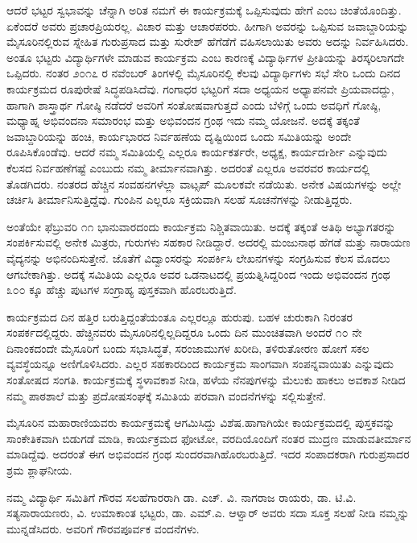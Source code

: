{ಆದರೆ ಭಟ್ಟರ ಸ್ವಭಾವನ್ನು ಚೆನ್ನಾಗಿ ಅರಿತ ನಮಗೆ ಈ ಕಾರ್ಯಕ್ರಮಕ್ಕೆ ಒಪ್ಪಿಸುವುದು ಹೇಗೆ ಎಂಬ ಚಿಂತೆಯೊಂದಿತ್ತು. ಏಕೆಂದರೆ ಅವರು ಪ್ರಚಾರಪ್ರಿಯರಲ್ಲ. ವಿಚಾರ ಮತ್ತು ಆಚಾರಪರರು. ಹೀಗಾಗಿ ಅವರನ್ನು ಒಪ್ಪಿಸುವ ಜವಾಬ್ದಾರಿಯನ್ನು ಮೈಸೂರಿನಲ್ಲಿರುವ ಸ್ನೇಹಿತ ಗುರುಪ್ರಸಾದ ಮತ್ತು ಸುರೇಶ್ ಹೆಗೆಡೆಗೆ ವಹಿಸಲಾಯಿತು ಅವರು ಅದನ್ನು ನಿರ್ವಹಿಸಿದರು. ಅಂತೂ ಭಟ್ಟರು ವಿದ್ಯಾರ್ಥಿಗಳೇ ಮಾಡುವ ಕಾರ್ಯಕ್ರಮ ಎಂಬ ಕಾರಣಕ್ಕೆ ವಿದ್ಯಾರ್ಥಿಗಳ ಪ್ರೀತಿಯನ್ನು ತಿರಸ್ಕರಿಲಾಗದೇ ಒಪ್ಪಿದರು. ನಂತರ ೨೦೧೭ ರ ನವೆಂಬರ್ ತಿಂಗಳಲ್ಲಿ ಮೈಸೂರಿನಲ್ಲಿ ಕೆಲವು ವಿದ್ಯಾರ್ಥಿಗಳು ಸಭೆ ಸೇರಿ ಒಂದು ದಿನದ ಕಾರ್ಯಕ್ರಮದ ರೂಪುರೇಷೆ ಸಿದ್ಧಪಡಿಸಿದೆವು. ಗಂಗಾಧರ ಭಟ್ಟರಿಗೆ ಸದಾ ಅಧ್ಯಯನ ಅಧ್ಯಾಪನವೇ ಪ್ರಿಯವಾದದ್ದು, ಹಾಗಾಗಿ ಶಾಸ್ತ್ರಾರ್ಥ ಗೋಷ್ಠಿ ನಡೆದರೆ ಅವರಿಗೆ ಸಂತೋಷವಾಗುತ್ತದೆ ಎಂದು ಬೆಳಿಗ್ಗೆ ಒಂದು ಅವಧಿಗೆ ಗೋಷ್ಠಿ, ಮಧ್ಯಾಹ್ನ ಅಭಿವಂದನಾ ಸಮಾರಂಭ ಮತ್ತು ಅಭಿವಂದನ ಗ್ರಂಥ ಇದು ನಮ್ಮ ಯೋಜನೆ. ಅದಕ್ಕೆ ತಕ್ಕಂತೆ ಜವಾಬ್ದಾರಿಯನ್ನು ಹಂಚಿ, ಕಾರ್ಯಭಾರದ ನಿರ್ವಹಣೆಯ ದೃಷ್ಟಿಯಿಂದ ಒಂದು ಸಮಿತಿಯನ್ನು ಅಂದೇ ರೂಪಿಸಿಕೊಂಡೆವು. ಆದರೆ ನಮ್ಮ ಸಮಿತಿಯಲ್ಲಿ ಎಲ್ಲರೂ ಕಾರ್ಯಕರ್ತರೇ, ಅಧ್ಯಕ್ಷ, ಕಾರ್ಯದrರ್ಶೀ ಎನ್ನುವುದು ಕೆಲಸದ ನಿರ್ವಹಣೆಗಷ್ಟೆ ಎಂಬುದು ನಮ್ಮ ತೀರ್ಮಾನವಾಗಿತ್ತು. ಅದರಂತೆ ಎಲ್ಲರೂ ಅವರವರ ಕಾರ್ಯದಲ್ಲಿ ತೊಡಗಿದರು. ನಂತರದ ಹೆಚ್ಚಿನ ಸಂವಹನಗಳೆಲ್ಲಾ ವಾಟ್ಸಪ್ ಮೂಲಕವೇ ನಡೆಯಿತು. ಅನೇಕ ವಿಷಯಗಳನ್ನು ಅಲ್ಲೇ ಚರ್ಚಿಸಿ ತೀರ್ಮಾನಿಸುತ್ತಿದ್ದೆವು. ಗುಂಪಿನ ಎಲ್ಲರೂ ಸಕ್ರಿಯ\-ವಾಗಿ ಸಲಹೆ ಸೂಚನೆಗಳನ್ನು ನೀಡುತ್ತಿದ್ದರು.

ಅಂತೆಯೇ ಫೆಬ್ರುವರಿ ೧೧ ಭಾನುವಾರದಂದು ಕಾರ್ಯಕ್ರಮ ನಿಶ್ಚಿತವಾಯಿತು. ಅದಕ್ಕೆ ತಕ್ಕಂತೆ ಅತಿಥಿ ಅಭ್ಯಾಗತರನ್ನು ಸಂಪರ್ಕಿಸುವಲ್ಲಿ ಅನೇಕ ಮಿತ್ರರು, ಗುರುಗಳು ಸಹಕಾರ ನೀಡಿದ್ದಾರೆ. ಅದರಲ್ಲಿ ಮಂಜುನಾಥ ಹೆಗಡೆ ಮತ್ತು ನಾರಾಯಣ ವೈದ್ಯನನ್ನು ಅಭಿನಂದಿಸುತ್ತೇನೆ. ಜೊತೆಗೆ ವಿದ್ವಾಂಸರನ್ನು ಸಂಪರ್ಕಿಸಿ ಲೇಖನಗಳನ್ನು ಸಂಗ್ರಹಿಸುವ ಕೆಲಸ ಮೊದಲು ಆಗಬೇಕಾಗಿತ್ತು. ಅದಕ್ಕೆ ಸಮಿತಿಯ ಎಲ್ಲರೂ ಅವರ ಒಡನಾಟದಲ್ಲಿ ಪ್ರಯತ್ನಿಸಿದ್ದರಿಂದ ಇಂದು ಅಭಿವಂದನ ಗ್ರಂಥ ೩೦೦ ಕ್ಕೂ ಹೆಚ್ಚು ಪುಟಗಳ ಸಂಗ್ರಾಹ್ಯ ಪುಸ್ತಕವಾಗಿ ಹೊರಬರುತ್ತಿದೆ.

ಕಾರ್ಯಕ್ರಮದ ದಿನ ಹತ್ತಿರ ಬರುತ್ತಿದ್ದಂತೆಯಂತೂ ಎಲ್ಲರಲ್ಲೂ ಹುರುಪು. ಬಹಳ ಚುರುಕಾಗಿ ನಿರಂತರ ಸಂಪರ್ಕದಲ್ಲಿದ್ದರು. ಹೆಚ್ಚಿನವರು ಮೈಸೂರಿನಲ್ಲಿಲ್ಲದಿದ್ದರೂ ಒಂದು ದಿನ ಮುಂಚಿತವಾಗಿ ಅಂದರೆ ೧೦ ನೇ ದಿನಾಂಕದಂದೇ ಮೈಸೂರಿಗೆ ಬಂದು ಸಭಾಸಿದ್ಧತೆ, ಸರಂಜಾಮುಗಳ ಖರೀದಿ, ತಳಿರುತೋರಣ ಹೋಗೆ ಸಕಲ ವ್ಯವಸ್ಥೆಯನ್ನೂ ಅಣಿಗೊಳಿಸಿದರು. ಎಲ್ಲರ ಸಹಕಾರದಿಂದ ಕಾರ್ಯಕ್ರಮ ಸಾಂಗವಾಗಿ ಸಂಪನ್ನ\-ವಾಯಿತು ಎನ್ನುವುದು ಸಂತೋಷದ ಸಂಗತಿ. ಕಾರ್ಯಕ್ರಮಕ್ಕೆ ಸ್ಥಳಾವಕಾಶ ನೀಡಿ, ಹಳೆಯ ನೆನಪುಗಳನ್ನು ಮೆಲುಕು ಹಾಕಲು ಅವಕಾಶ ನೀಡಿದ ನಮ್ಮ ಪಾಠಶಾಲೆ ಮತ್ತು ಪ್ರದೋಷಸಂಘಕ್ಕೆ ಸಮಿತಿಯ ಪರವಾಗಿ ವಂದನೆಗಳನ್ನು ಸಲ್ಲಿಸುತ್ತೇನೆ.

ಮೈಸೂರಿನ ಮಹಾರಾಣಿಯವರು ಕಾರ್ಯಕ್ರಮಕ್ಕೆ ಆಗಮಿಸಿದ್ದು ವಿಶೆಷ.\break ಹಾಗಾಗಿಯೇ ಕಾರ್ಯಕ್ರಮದಲ್ಲಿ ಪುಸ್ತಕವನ್ನು ಸಾಂಕೇತಿಕವಾಗಿ ಬಿಡುಗಡೆ ಮಾಡಿ, ಕಾರ್ಯಕ್ರಮದ ಫೋಟೋ, ವರದಿಯೊಂದಿಗೆ ನಂತರ ಮುದ್ರಣ ಮಾಡುವ\break ತೀರ್ಮಾನ ಮಾಡಿದ್ದೆವು. ಅದರಂತೆ ಈಗ ಅಭಿವಂದನ ಗ್ರಂಥ ಸುಂದರವಾಗಿ\break ಹೊರಬರುತ್ತಿದೆ. ಇದರ ಸಂಪಾದಕರಾಗಿ ಗುರುಪ್ರಸಾದರ ಶ್ರಮ ಶ್ಲಾಘನೀಯ.

ನಮ್ಮ ವಿದ್ಯಾರ್ಥಿ ಸಮಿತಿಗೆ ಗೌರವ ಸಲಹೆಗಾರರಾಗಿ ಡಾ. ಎಚ್. ವಿ. ನಾಗರಾಜ ರಾಯರು, ಡಾ. ಟಿ.ವಿ. ಸತ್ಯನಾರಾಯಣರು, ವಿ. ಉಮಾಕಾಂತ ಭಟ್ಟರು, ಡಾ. ಎಮ್.ಎ. ಆಳ್ವಾರ್ ಅವರು ಸದಾ ಸೂಕ್ತ ಸಲಹೆ ನೀಡಿ ನಮ್ಮನ್ನು ಮುನ್ನಡೆಸಿದರು. ಅವರಿಗೆ ಗೌರವಪೂರ್ವಕ ವಂದನೆಗಳು.
\newpage

}
